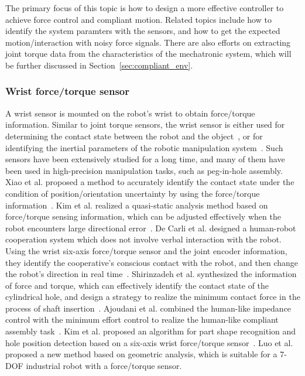 \documentclass[journal,twoside,web]{ieeecolor}
\begin{document}
The primary focus of this topic is how to design a more effective controller to achieve force control and compliant motion. Related topics include how to identify the system paramters with the sensors, and how to get the expected motion/interaction with noisy force signals. 
There are also efforts on extracting joint torque data from the characteristics of the mechatronic system, which will be further discussed in Section~\ref{sec:compliant_env}.

\subsubsection{Wrist force/torque sensor}

A wrist sensor is mounted on the robot's wrist to obtain force/torque information. 
Similar to joint torque sensors, the wrist sensor is either used for determining the contact state between the robot and the object~\cite{Garcia2009,Garciaa,Choi2015}, or for identifying the inertial parameters of the robotic manipulation system~\cite{Villani2000,Du2018a}.
Such sensors have been extensively studied for a long time, and many of them have been used in high-precision manipulation tasks, such as peg-in-hole assembly.
Xiao et al. proposed a method to accurately identify the contact state under the condition of position/orientation uncertainty by using the force/torque information~\cite{Xiao1998}. 
Kim et al. realized a quasi-static analysis method based on force/torque sensing information, which can be adjusted effectively when the robot encounters large directional error~\cite{Kim1999}.
De Carli et al. designed a human-robot cooperation system which does not involve verbal interaction with the robot.
Using the wrist six-axis force/torque sensor and the joint encoder information, they identify the cooperative's conscious contact with the robot, and then change the robot's direction in real time~\cite{De2009}. 
Shirinzadeh et al. synthesized the information of force and torque, which can effectively identify the contact state of the cylindrical hole, and design a strategy to realize the minimum contact force in the process of shaft insertion~\cite{Shirinzadeh11Hybrid}. 
Ajoudani et al. combined the human-like impedance control with the minimum effort control to realize the human-like compliant assembly task~\cite{Ajoudani2013}. 
Kim et al. proposed an algorithm for part shape recognition and hole position detection based on a six-axis wrist force/torque sensor~\cite{Kim14}. 
Luo et al. proposed a new method based on geometric analysis, which is suitable for a 7-DOF industrial robot with a force/torque sensor. 
\end{document}
